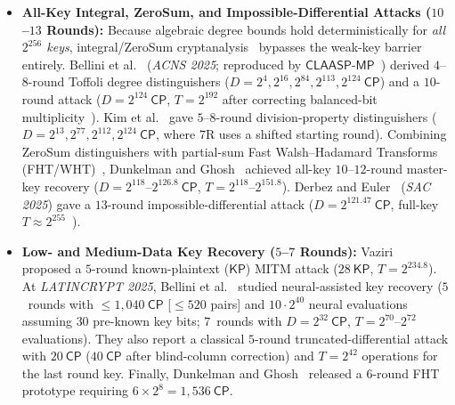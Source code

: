 \documentclass[11pt,a4paper]{article}
\theoremstyle{definition}
\theoremstyle{remark}
\newcommand{\CP}{\mathsf{CP}}
\newcommand{\KP}{\mathsf{KP}}
\begin{document}
\begin{itemize}[leftmargin=1.8em]
\begin{enumerate}[label=(\alph*),leftmargin=1.5em]
    \end{enumerate}
    \item \textbf{All-Key Integral, ZeroSum, and Impossible-Differential Attacks ($10$--$13$ Rounds):} Because algebraic degree bounds hold deterministically for \emph{all $2^{256}$ keys}, integral/ZeroSum cryptanalysis~\cite{KW02} bypasses the weak-key barrier entirely. Bellini et al.~\cite{BRRT25} (\emph{ACNS 2025}; reproduced by $\mathsf{CLAASP\text{-}MP}$~\cite{CLAASPMP26}) derived $4$--$8$-round Toffoli degree distinguishers ($D = 2^4, 2^{16}, 2^{84}, 2^{113}, 2^{124}~\CP$) and a $10$-round attack ($D = 2^{124}~\CP$, $T = 2^{192}$ after correcting balanced-bit multiplicity~\cite{DG25}). Kim et al.~\cite{KKL24} gave $5$--$8$-round division-property distinguishers ($D = 2^{13}, 2^{77}, 2^{112}, 2^{124}~\CP$, where $7$R uses a shifted starting round). Combining ZeroSum distinguishers with partial-sum Fast Walsh--Hadamard Transforms (FHT/WHT)~\cite{FKL00,CSQ07,TA14,DGK24}, Dunkelman and Ghosh~\cite{DG25} achieved all-key $10$--$12$-round master-key recovery ($D = 2^{118}$--$2^{126.8}~\CP$, $T = 2^{118}$--$2^{151.8}$). Derbez and Euler~\cite{DE25} (\emph{SAC 2025}) gave a $13$-round impossible-differential attack ($D = 2^{121.47}~\CP$, full-key $T \approx 2^{255}$~\cite{GMNP25}).
    \item \textbf{Low- and Medium-Data Key Recovery ($5$--$7$ Rounds):} Vaziri~\cite{Vaz25} proposed a $5$-round known-plaintext ($\KP$) MITM attack ($28~\KP$, $T = 2^{234.8}$). At \emph{LATINCRYPT 2025}, Bellini et al.~\cite{BBGHP25} studied neural-assisted key recovery ($5$~rounds with $\le 1{,}040~\CP$ [$\le 520$ pairs] and $10 \cdot 2^{40}$ neural evaluations assuming $30$ pre-known key bits; $7$~rounds with $D = 2^{32}~\CP$, $T = 2^{70}$--$2^{72}$ evaluations). They also report a classical $5$-round truncated-differential attack with $20~\CP$ ($40~\CP$ after blind-column correction) and $T = 2^{42}$ operations for the last round key. Finally, Dunkelman and Ghosh~\cite[Footnote~4, p.~16]{DG25} released a $6$-round FHT prototype requiring $6 \times 2^8 = 1{,}536~\CP$.
\end{itemize}
\end{document}
